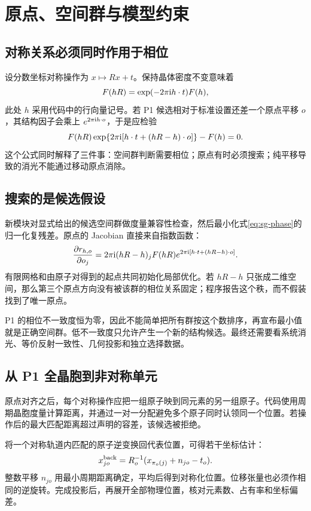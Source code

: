 \chapter{原点、空间群与模型约束}
\section{对称关系必须同时作用于相位}
设分数坐标对称操作为 $x\mapsto Rx+t$。保持晶体密度不变意味着
\begin{equation}
 F(hR)=\exp(-2\pi\mathrm{i} h\cdot t)F(h),
\end{equation}
此处 $h$ 采用代码中的行向量记号。若 P1 候选相对于标准设置还差一个原点平移 $o$，其结构因子会乘上 $e^{2\pi\mathrm{i} h\cdot o}$，于是应检验
\begin{equation}\label{eq:sg-phase}
 F(hR)\exp\{2\pi\mathrm{i}[h\cdot t+(hR-h)\cdot o]\}-F(h)=0.
\end{equation}
这个公式同时解释了三件事：空间群判断需要相位；原点有时必须搜索；纯平移导致的消光不能通过移动原点消除。

\section{搜索的是候选假设}
新模块对显式给出的候选空间群做度量兼容性检查，然后最小化式\eqref{eq:sg-phase}的归一化复残差。原点的 Jacobian 直接来自指数函数：
\begin{equation}
 \frac{\partial r_{h,o}}{\partial o_j}
 =2\pi\mathrm{i}(hR-h)_jF(hR)
 e^{2\pi\mathrm{i}[h\cdot t+(hR-h)\cdot o]}.
\end{equation}
有限网格和由原子对得到的起点共同初始化局部优化。若 $hR-h$ 只张成二维空间，那么第三个原点方向没有被该群的相位关系固定；程序报告这个秩，而不假装找到了唯一原点。

P1 的相位不一致度恒为零，因此不能简单把所有群按这个数排序，再宣布最小值就是正确空间群。低不一致度只允许产生一个新的结构候选。最终还需要看系统消光、等价反射一致性、几何投影和独立选择数据。

\section{从 P1 全晶胞到非对称单元}
原点对齐之后，每个对称操作应把一组原子映到同元素的另一组原子。代码使用周期晶胞度量计算距离，并通过一对一分配避免多个原子同时认领同一个位置。若操作后的最大匹配距离超过声明的容差，该候选被拒绝。

将一个对称轨道内匹配的原子逆变换回代表位置，可得若干坐标估计：
\begin{equation}
 x_{jo}^{\rm back}=R_o^{-1}(x_{\pi_o(j)}+n_{jo}-t_o).
\end{equation}
整数平移 $n_{jo}$ 用最小周期距离确定，平均后得到对称化位置。位移张量也必须作相同的逆旋转。完成投影后，再展开全部物理位置，核对元素数、占有率和坐标偏差。


